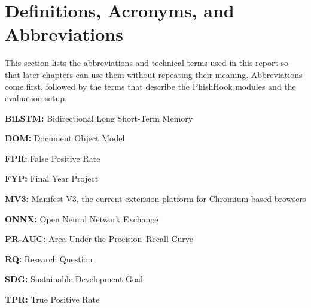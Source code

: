 \documentclass{FastFyp}
\begin{document}
\section{Definitions, Acronyms, and Abbreviations}
\label{sec:definitions}
This section lists the abbreviations and technical terms used in this report so that later chapters can use them without repeating their meaning. Abbreviations come first, followed by the terms that describe the PhishHook modules and the evaluation setup.

\vspace{0.5em}
\noindent\textbf{BiLSTM:} Bidirectional Long Short-Term Memory\par\medskip
\noindent\textbf{DOM:} Document Object Model\par\medskip
\noindent\textbf{FPR:} False Positive Rate\par\medskip
\noindent\textbf{FYP:} Final Year Project\par\medskip
\noindent\textbf{MV3:} Manifest V3, the current extension platform for Chromium-based browsers\par\medskip
\noindent\textbf{ONNX:} Open Neural Network Exchange\par\medskip
\noindent\textbf{PR-AUC:} Area Under the Precision--Recall Curve\par\medskip
\noindent\textbf{RQ:} Research Question\par\medskip
\noindent\textbf{SDG:} Sustainable Development Goal\par\medskip
\noindent\textbf{TPR:} True Positive Rate\par\medskip
\end{document}
